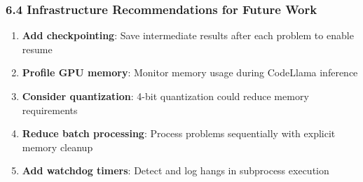 \subsubsection{6.4 Infrastructure Recommendations for Future Work}

\begin{enumerate}
\item \textbf{Add checkpointing}: Save intermediate results after each problem to enable resume
\item \textbf{Profile GPU memory}: Monitor memory usage during CodeLlama inference
\item \textbf{Consider quantization}: 4-bit quantization could reduce memory requirements
\item \textbf{Reduce batch processing}: Process problems sequentially with explicit memory cleanup
\item \textbf{Add watchdog timers}: Detect and log hangs in subprocess execution
\end{enumerate}

